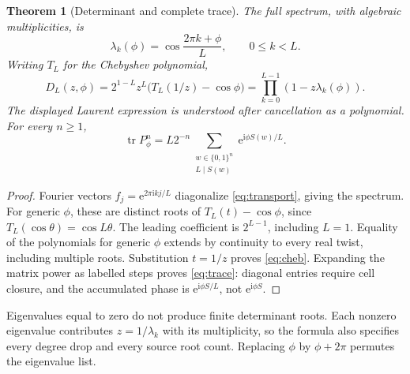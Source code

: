 \documentclass[10pt]{article}
\newtheorem{theorem}{Theorem}
\newcommand{\ii}{\mathrm i}
\newcommand{\ee}{\mathrm e}
\newcommand{\tr}{\operatorname{tr}}
\begin{document}
\begin{theorem}[Determinant and complete trace]\label{thm:det}
The full spectrum, with algebraic multiplicities, is
\[
\lambda_k(\phi)=\cos\frac{2\pi k+\phi}{L},\qquad0\leq k<L.
\]
Writing $T_L$ for the Chebyshev polynomial,
\begin{equation}\label{eq:cheb}
D_L(z,\phi)=2^{1-L}z^L\bigl(T_L(1/z)-\cos\phi\bigr)
=\prod_{k=0}^{L-1}(1-z\lambda_k(\phi)).
\end{equation}
The displayed Laurent expression is understood after cancellation as a
polynomial. For every $n\geq1$,
\begin{equation}\label{eq:trace}
\tr P_\phi^n=L2^{-n}\sum_{\substack{w\in\{0,1\}^n\\L\mid S(w)}}
\ee^{\ii\phi S(w)/L}.
\end{equation}
\end{theorem}
\begin{proof}
Fourier vectors $f_j=\ee^{2\pi\ii kj/L}$ diagonalize
\eqref{eq:transport}, giving the spectrum. For generic $\phi$, these are
distinct roots of $T_L(t)-\cos\phi$, since $T_L(\cos\theta)=\cos L\theta$.
The leading coefficient is $2^{L-1}$, including $L=1$. Equality of the
polynomials for generic $\phi$ extends by continuity to every real twist,
including multiple roots. Substitution $t=1/z$ proves \eqref{eq:cheb}.
Expanding the matrix power as labelled steps proves \eqref{eq:trace}:
diagonal entries require cell closure, and the accumulated phase is
$\ee^{\ii\phi S/L}$, not $\ee^{\ii\phi S}$.
\end{proof}

Eigenvalues equal to zero do not produce finite determinant roots. Each
nonzero eigenvalue contributes $z=1/\lambda_k$ with its multiplicity, so the
formula also specifies every degree drop and every source root count.
Replacing $\phi$ by $\phi+2\pi$ permutes the eigenvalue list.
\end{document}
